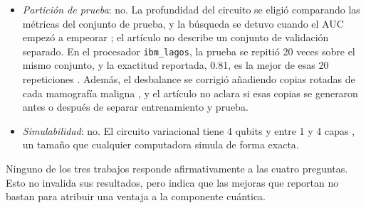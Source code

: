 \begin{itemize}
  Los autores interpretan esa diferencia de AUC como un indicio de alguna ventaja del circuito híbrido \cite{Azevedo2022QuantumTransfer}, pero no reportan intervalos de confianza ni pruebas estadísticas.
  En sus conclusiones son prudentes: consideran prematuro decir si el QML puede ser una ventaja \cite{Azevedo2022QuantumTransfer}.
  \item \textit{Partición de prueba}: no.
  La profundidad del circuito se eligió comparando las métricas del conjunto de prueba, y la búsqueda se detuvo cuando el AUC empezó a empeorar \cite{Azevedo2022QuantumTransfer}; el artículo no describe un conjunto de validación separado.
  En el procesador \texttt{ibm\_lagos}, la prueba se repitió 20 veces sobre el mismo conjunto, y la exactitud reportada, 0.81, es la mejor de esas 20 repeticiones \cite{Azevedo2022QuantumTransfer}.
  Además, el desbalance se corrigió añadiendo copias rotadas de cada mamografía maligna \cite{Azevedo2022QuantumTransfer}, y el artículo no aclara si esas copias se generaron antes o después de separar entrenamiento y prueba.
  \item \textit{Simulabilidad}: no.
  El circuito variacional tiene 4 qubits y entre 1 y 4 capas \cite{Azevedo2022QuantumTransfer}, un tamaño que cualquier computadora simula de forma exacta.
\end{itemize}

Ninguno de los tres trabajos responde afirmativamente a las cuatro preguntas. Esto no invalida sus resultados, pero indica que las mejoras que reportan no bastan para atribuir una ventaja a la componente cuántica.
